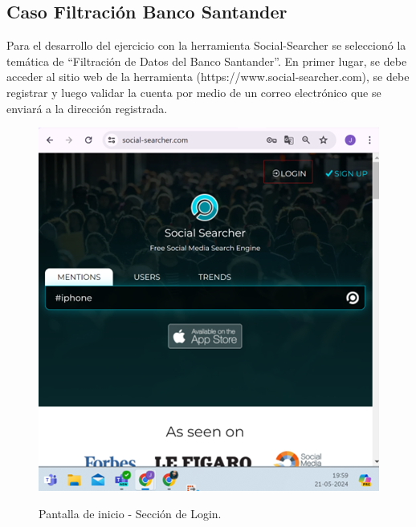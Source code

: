 \documentclass[stu, 11pt, letterpaper, donotrepeattitle, floatsintext, natbib]{apa7}
\begin{document}
\subsection{Caso Filtración Banco Santander}

Para el desarrollo del ejercicio con la herramienta Social-Searcher se seleccionó la temática de “Filtración de Datos del Banco Santander”. 
En primer lugar, se debe acceder al sitio web de la herramienta (https://www.social-searcher.com), se debe registrar y luego validar la cuenta por medio de un correo electrónico que se enviará a la dirección registrada.

\begin{figure}[H]
\centering
\caption{Pantalla de inicio - Sección de Login.}
\includegraphics[width=0.75\linewidth]{osi5.png} %
\label{fig:OverallEffect}
\end{figure}
\end{document}
